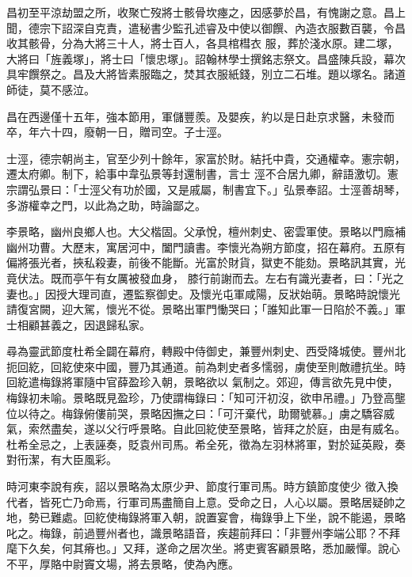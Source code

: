 \begin{pinyinscope}
 昌初至平涼劫盟之所，收聚亡歿將士骸骨坎瘞之，因感夢於昌，有愧謝之意。昌上聞，德宗下詔深自克責，遣秘書少監孔述睿及中使以御饌、內造衣服數百襲，令昌收其骸骨，分為大將三十人，將士百人，各具棺槥衣
 服，葬於淺水原。建二塚，大將曰「旌義塚」，將士曰「懷忠塚」。詔翰林學士撰銘志祭文。昌盛陳兵設，幕次具牢饌祭之。昌及大將皆素服臨之，焚其衣服紙錢，別立二石堆。題以塚名。諸道師徒，莫不感泣。



 昌在西邊僅十五年，強本節用，軍儲豐羨。及嬰疾，約以是日赴京求醫，未發而卒，年六十四，廢朝一日，贈司空。子士涇。



 士涇，德宗朝尚主，官至少列十餘年，家富於財。結托中貴，交通權幸。憲宗朝，遷太府卿。制下，給事中韋弘景等封還制書，言士
 涇不合居九卿，辭語激切。憲宗謂弘景曰：「士涇父有功於國，又是戚屬，制書宜下。」弘景奉詔。士涇善胡琴，多游權幸之門，以此為之助，時論鄙之。



 李景略，幽州良鄉人也。大父楷固。父承悅，檀州刺史、密雲軍使。景略以門廕補幽州功曹。大歷末，寓居河中，闔門讀書。李懷光為朔方節度，招在幕府。五原有偏將張光者，挾私殺妻，前後不能斷。光富於財貨，獄吏不能劾。景略訊其實，光竟伏法。既而亭午有女厲被發血身，
 膝行前謝而去。左右有識光妻者，曰：「光之妻也。」因授大理司直，遷監察御史。及懷光屯軍咸陽，反狀始萌。景略時說懷光請復宮闕，迎大駕，懷光不從。景略出軍門慟哭曰；「誰知此軍一日陷於不義。」軍士相顧甚義之，因退歸私家。



 尋為靈武節度杜希全闢在幕府，轉殿中侍御史，兼豐州刺史、西受降城使。豐州北扼回紇，回紇使來中國，豐乃其通道。前為刺史者多懦弱，虜使至則敵禮抗坐。時回紇遣梅錄將軍隨中官薛盈珍入朝，景略欲以
 氣制之。郊迎，傳言欲先見中使，梅錄初未喻。景略既見盈珍，乃使謂梅錄曰：「知可汗初沒，欲申吊禮。」乃登高壟位以待之。梅錄俯僂前哭，景略因撫之曰：「可汗棄代，助爾號慕。」虜之驕容威氣，索然盡矣，遂以父行呼景略。自此回紇使至景略，皆拜之於庭，由是有威名。杜希全忌之，上表誣奏，貶袁州司馬。希全死，徵為左羽林將軍，對於延英殿，奏對衎潔，有大臣風彩。



 時河東李說有疾，詔以景略為太原少尹、節度行軍司馬。時方鎮節度使少
 徵入換代者，皆死亡乃命焉，行軍司馬盡簡自上意。受命之日，人心以屬。景略居疑帥之地，勢已難處。回紇使梅錄將軍入朝，說置宴會，梅錄爭上下坐，說不能遏，景略叱之。梅錄，前過豐州者也，識景略語音，疾趨前拜曰：「非豐州李端公耶？不拜麾下久矣，何其瘠也。」又拜，遂命之居次坐。將吏賓客顧景略，悉加嚴憚。說心不平，厚賂中尉竇文場，將去景略，使為內應。




\end{pinyinscope}
